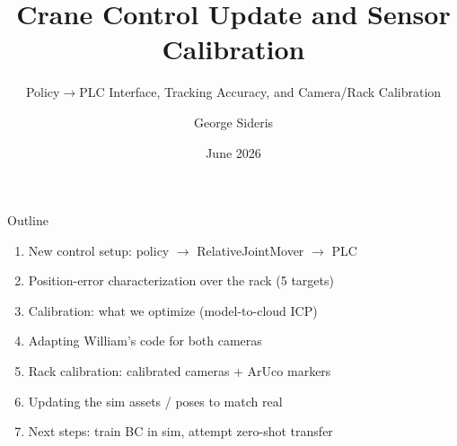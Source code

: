 \documentclass[aspectratio=169]{beamer}
\title[Crane Control \& Calibration]{Crane Control Update and Sensor Calibration}
\subtitle{Policy$\to$PLC Interface, Tracking Accuracy, and Camera/Rack Calibration}
\author{George Sideris}
\institute{AML, McGill University \;|\; FPInnovations}
\date{June 2026}
\begin{document}
\begin{frame}
  \titlepage
\end{frame}

\begin{frame}{Outline}
\begin{enumerate}\setlength{\itemsep}{5pt}
  \item New control setup: policy $\to$ RelativeJointMover $\to$ PLC
  \item Position-error characterization over the rack (5 targets)
  \item Calibration: what we optimize (model-to-cloud ICP)
  \item Adapting William's code for both cameras
  \item Rack calibration: calibrated cameras + ArUco markers
  \item Updating the sim assets / poses to match real
  \item Next steps: train BC in sim, attempt zero-shot transfer
\end{enumerate}
\end{frame}
\end{document}
